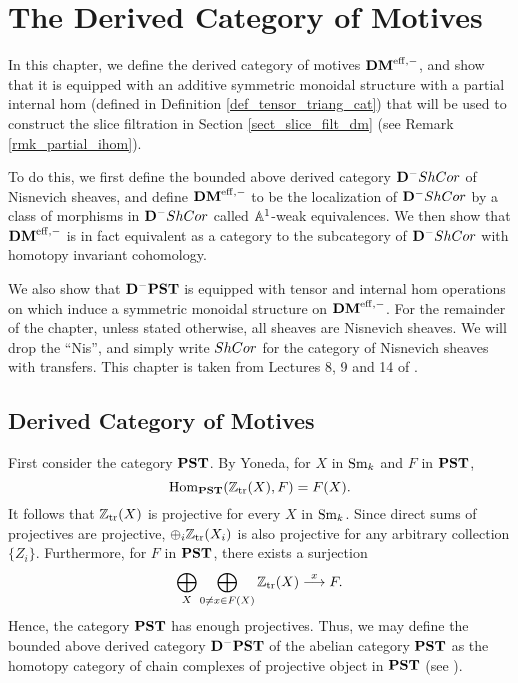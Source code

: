 \newpage
\chapter{The Derived Category of Motives}\label{sect_dmeff_and_dm}

In this chapter, we define the derived category of motives $\DMeff$,
and show that it is equipped with an additive symmetric monoidal 
structure with a partial internal hom (defined in Definition
\ref{def_tensor_triang_cat}) that will be used to construct the 
slice filtration in Section \ref{sect_slice_filt_dm} (see Remark 
\ref{rmk_partial_ihom}).

To do this, we first define the bounded above derived category 
$\DCat^-\ShCor$ of Nisnevich sheaves, and define $\DMeff$ to be
the localization of $\DCat^-\ShCor$ by a class of morphisms in
$\DCat^-\ShCor$ called $\A^1$-weak equivalences. We then show that
$\DMeff$ is in fact equivalent as a category to the subcategory
of $\DCat^-\ShCor$ with homotopy invariant cohomology. 

We also show that $\DCat^-\PST$ is equipped with tensor and 
internal hom operations on which induce a symmetric monoidal 
structure on $\DMeff$. For the remainder of the chapter, unless 
stated otherwise, all sheaves are Nisnevich sheaves. We will drop 
the ``Nis'', and simply write $\ShCor$ for the category of 
Nisnevich sheaves with transfers. This chapter is taken from
Lectures 8, 9 and 14 of \cite{MVW}.

\section{Derived Category of Motives}

First consider the category $\PST$. By Yoneda, for $X$ in $\Sm$ and
$F$ in $\PST$,
\[
\hom_{\PST}(\Ztr(X), F) = F(X).
\]
It follows that $\Ztr(X)$ is projective for every $X$ in $\Sm$.
Since direct sums of projectives are projective, 
$\oplus_i \Ztr(X_i)$ is also projective for any arbitrary 
collection $\{Z_i\}$. Furthermore, for $F$ in $\PST$, there exists 
a surjection
\begin{equation}\label{eq_res_by_rep}
\bigoplus_{X} \bigoplus_{0 \neq x \in F(X)} \Ztr(X) 
   \stackrel{x}{\to} F.
\end{equation}
Hence, the category $\PST$ has enough projectives. Thus, we may 
define the bounded above derived category $\DCat[D]^-\PST$ of the 
abelian category $\PST$ as the homotopy category of chain 
complexes of projective object in $\PST$ (see 
\cite[10.4.8]{WH}).

